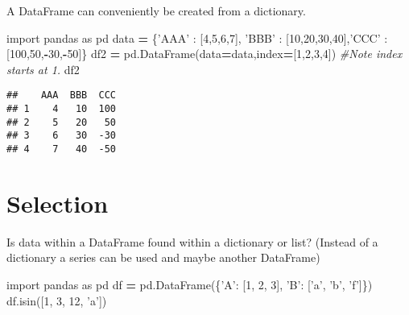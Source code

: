\documentclass[]{book}
\newenvironment{Shaded}{\begin{snugshade}}{\end{snugshade}}
\newcommand{\DecValTok}[1]{\textcolor[rgb]{0.00,0.00,0.81}{#1}}
\newcommand{\StringTok}[1]{\textcolor[rgb]{0.31,0.60,0.02}{#1}}
\newcommand{\ImportTok}[1]{#1}
\newcommand{\CommentTok}[1]{\textcolor[rgb]{0.56,0.35,0.01}{\textit{#1}}}
\newcommand{\OperatorTok}[1]{\textcolor[rgb]{0.81,0.36,0.00}{\textbf{#1}}}
\newcommand{\NormalTok}[1]{#1}
\begin{document}
A DataFrame can conveniently be created from a dictionary.

\begin{Shaded}
\begin{Highlighting}[]
\ImportTok{import}\NormalTok{ pandas }\ImportTok{as}\NormalTok{ pd}
\NormalTok{data }\OperatorTok{=}\NormalTok{ \{}\StringTok{'AAA'}\NormalTok{ : [}\DecValTok{4}\NormalTok{,}\DecValTok{5}\NormalTok{,}\DecValTok{6}\NormalTok{,}\DecValTok{7}\NormalTok{], }\StringTok{'BBB'}\NormalTok{ : [}\DecValTok{10}\NormalTok{,}\DecValTok{20}\NormalTok{,}\DecValTok{30}\NormalTok{,}\DecValTok{40}\NormalTok{],}\StringTok{'CCC'}\NormalTok{ : [}\DecValTok{100}\NormalTok{,}\DecValTok{50}\NormalTok{,}\OperatorTok{-}\DecValTok{30}\NormalTok{,}\OperatorTok{-}\DecValTok{50}\NormalTok{]\}}
\NormalTok{df2 }\OperatorTok{=}\NormalTok{ pd.DataFrame(data}\OperatorTok{=}\NormalTok{data,index}\OperatorTok{=}\NormalTok{[}\DecValTok{1}\NormalTok{,}\DecValTok{2}\NormalTok{,}\DecValTok{3}\NormalTok{,}\DecValTok{4}\NormalTok{]) }\CommentTok{#Note index starts at 1.}
\NormalTok{df2}
\end{Highlighting}
\end{Shaded}

\begin{verbatim}
##    AAA  BBB  CCC
## 1    4   10  100
## 2    5   20   50
## 3    6   30  -30
## 4    7   40  -50
\end{verbatim}

\section{Selection}\label{selection}

Is data within a DataFrame found within a dictionary or list? (Instead
of a dictionary a series can be used and maybe another DataFrame)

\begin{Shaded}
\begin{Highlighting}[]
\ImportTok{import}\NormalTok{ pandas }\ImportTok{as}\NormalTok{ pd}
\NormalTok{df }\OperatorTok{=}\NormalTok{ pd.DataFrame(\{}\StringTok{'A'}\NormalTok{: [}\DecValTok{1}\NormalTok{, }\DecValTok{2}\NormalTok{, }\DecValTok{3}\NormalTok{], }\StringTok{'B'}\NormalTok{: [}\StringTok{'a'}\NormalTok{, }\StringTok{'b'}\NormalTok{, }\StringTok{'f'}\NormalTok{]\})}
\NormalTok{df.isin([}\DecValTok{1}\NormalTok{, }\DecValTok{3}\NormalTok{, }\DecValTok{12}\NormalTok{, }\StringTok{'a'}\NormalTok{])}
\end{Highlighting}
\end{Shaded}
\end{document}
